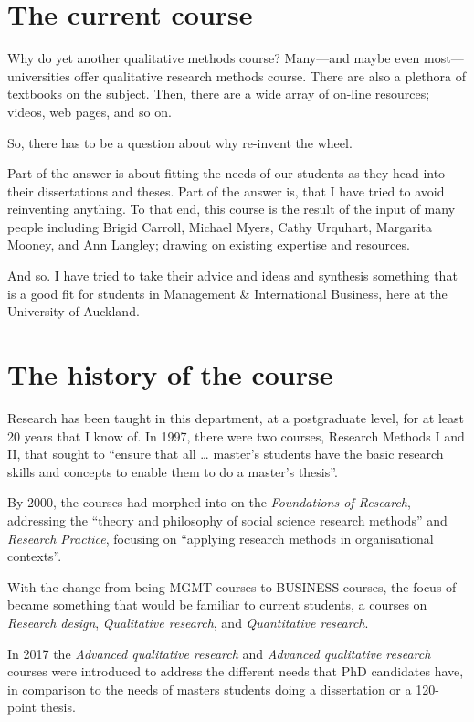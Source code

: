 \documentclass[]{book}
\theoremstyle{definition}
\theoremstyle{definition}
\theoremstyle{definition}
\theoremstyle{remark}
\begin{document}
\hypertarget{the-current-course}{%
\section{The current course}\label{the-current-course}}

Why do yet another qualitative methods course? Many---and maybe even
most---universities offer qualitative research methods course. There are
also a plethora of textbooks on the subject. Then, there are a wide
array of on-line resources; videos, web pages, and so on.

So, there has to be a question about why re-invent the wheel.

Part of the answer is about fitting the needs of our students as they
head into their dissertations and theses. Part of the answer is, that I
have tried to avoid reinventing anything. To that end, this course is
the result of the input of many people including Brigid Carroll, Michael
Myers, Cathy Urquhart, Margarita Mooney, and Ann Langley; drawing on
existing expertise and resources.

And so. I have tried to take their advice and ideas and synthesis
something that is a good fit for students in Management \& International
Business, here at the University of Auckland.

\hypertarget{the-history-of-the-course}{%
\section{The history of the course}\label{the-history-of-the-course}}

Research has been taught in this department, at a postgraduate level,
for at least 20 years that I know of. In 1997, there were two courses,
Research Methods I and II, that sought to ``ensure that all \ldots{}
master's students have the basic research skills and concepts to enable
them to do a master's thesis''.

By 2000, the courses had morphed into on the \emph{Foundations of
Research}, addressing the ``theory and philosophy of social science
research methods'' and \emph{Research Practice}, focusing on ``applying
research methods in organisational contexts''.

With the change from being MGMT courses to BUSINESS courses, the focus
of became something that would be familiar to current students, a
courses on \emph{Research design}, \emph{Qualitative research}, and
\emph{Quantitative research}.

In 2017 the \emph{Advanced qualitative research} and \emph{Advanced
qualitative research} courses were introduced to address the different
needs that PhD candidates have, in comparison to the needs of masters
students doing a dissertation or a 120-point thesis.
\end{document}
